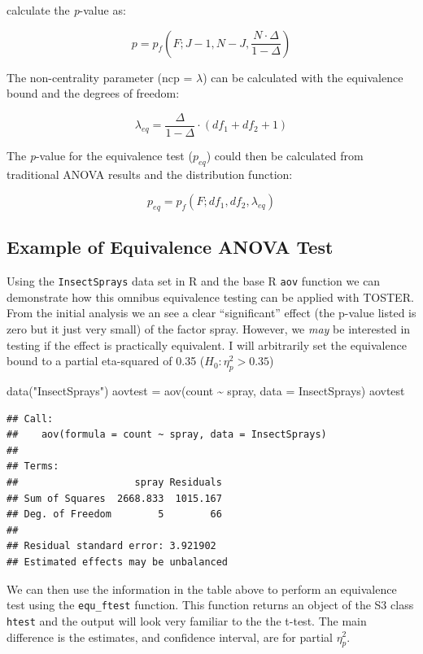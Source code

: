 \documentclass[]{interact}
\theoremstyle{plain}%
\theoremstyle{definition}
\theoremstyle{remark}
\newenvironment{Shaded}{\begin{snugshade}}{\end{snugshade}}
\newcommand{\AttributeTok}[1]{\textcolor[rgb]{0.77,0.63,0.00}{#1}}
\newcommand{\FunctionTok}[1]{\textcolor[rgb]{0.00,0.00,0.00}{#1}}
\newcommand{\NormalTok}[1]{#1}
\newcommand{\OtherTok}[1]{\textcolor[rgb]{0.56,0.35,0.01}{#1}}
\newcommand{\SpecialCharTok}[1]{\textcolor[rgb]{0.00,0.00,0.00}{#1}}
\newcommand{\StringTok}[1]{\textcolor[rgb]{0.31,0.60,0.02}{#1}}
\begin{document}
\citet{Campbell_2021} calculate the \emph{p}-value as:

\[
p = p_f(F; J-1, N-J, \frac{N \cdot \Delta}{1-\Delta})
\]

The non-centrality parameter (ncp = \(\lambda\)) can be calculated with
the equivalence bound and the degrees of freedom:

\[
\lambda_{eq} = \frac{\Delta}{1-\Delta} \cdot(df_1 + df_2 +1)
\]

The \emph{p}-value for the equivalence test (\(p_{eq}\)) could then be
calculated from traditional ANOVA results and the distribution function:

\[
p_{eq} = p_f(F; df_1, df_2, \lambda_{eq})
\]

\hypertarget{example-of-equivalence-anova-test}{%
\subsection{Example of Equivalence ANOVA
Test}\label{example-of-equivalence-anova-test}}

Using the \texttt{InsectSprays} data set in R and the base R
\texttt{aov} function we can demonstrate how this omnibus equivalence
testing can be applied with TOSTER. From the initial analysis we an see
a clear ``significant'' effect (the p-value listed is zero but it just
very small) of the factor spray. However, we \emph{may} be interested in
testing if the effect is practically equivalent. I will arbitrarily set
the equivalence bound to a partial eta-squared of 0.35
(\(H_0: \eta^2_p > 0.35\))

\begin{Shaded}
\begin{Highlighting}[]
\FunctionTok{data}\NormalTok{(}\StringTok{"InsectSprays"}\NormalTok{)}
\NormalTok{aovtest }\OtherTok{=} \FunctionTok{aov}\NormalTok{(count }\SpecialCharTok{\textasciitilde{}}\NormalTok{ spray, }\AttributeTok{data =}\NormalTok{ InsectSprays)}
\NormalTok{aovtest}
\end{Highlighting}
\end{Shaded}

\begin{verbatim}
## Call:
##    aov(formula = count ~ spray, data = InsectSprays)
## 
## Terms:
##                    spray Residuals
## Sum of Squares  2668.833  1015.167
## Deg. of Freedom        5        66
## 
## Residual standard error: 3.921902
## Estimated effects may be unbalanced
\end{verbatim}

We can then use the information in the table above to perform an
equivalence test using the \texttt{equ\_ftest} function. This function
returns an object of the S3 class \texttt{htest} and the output will
look very familiar to the the t-test. The main difference is the
estimates, and confidence interval, are for partial \(\eta^2_p\).
\end{document}
